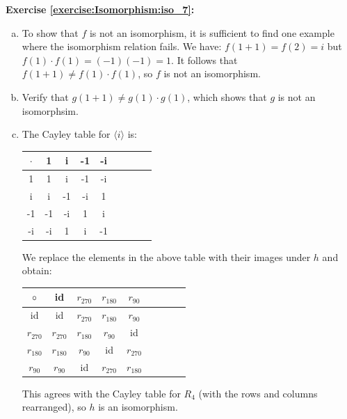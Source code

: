 \noindent\textbf{Exercise \ref{exercise:Isomorphism:iso_7}:}
\begin{enumerate}[(a)]
\item
To show that $f$ is not an isomorphism, it is sufficient to find one example where the isomorphism relation fails.
We have:  $f(1+1) = f(2) = i$  but $f(1) \cdot f(1) = (-1)(-1) = 1$.  It follows that $f(1+1) \neq f(1)\cdot f(1)$, so $f$ is not an isomorphism.

\item
Verify that $g(1+1) \neq g(1)\cdot g(1)$, which shows that $g$ is not an isomorphsim.\\

\item
The Cayley table for $\langle i \rangle$ is:

\begin{multicols}{2}
\begin{table}[H]
{\small
\begin{center}
\begin{tabular}{c|cccccccc}
$\cdot$ & 1 & i & -1 & -i  \\
\hline
1        & 1 & i & -1 & -i  \\
i       & i & -1 & -i & 1  \\
-1       & -1 & -i & 1 & i \\
-i    & -i & 1 & i & -1 \\
\end{tabular}
\end{center}
}
\end{table}
\end{multicols}
We replace the elements in the above table with their images under $h$ and obtain:

\begin{multicols}{2}
\begin{table}[H]
{\small
\begin{center}
\begin{tabular}{c|cccccccc}
$\circ$ & id &$r_{270}$ &$ r_{180}$ & $r_{90}$  \\
\hline
id        & id & $r_{270}$ &$r_{180}$ & $r_{90}$  \\
$r_{270}$ & $r_{270}$ &$r_{180}$ & $r_{90}$ & id \\
$r_{180}$ &$r_{180}$ & $r_{90}$ & id& $r_{270}$  \\
$r_{90}$   & $r_{90}$ & id& $r_{270}$ &$r_{180}$ \\
\end{tabular}
\end{center}
}
\end{table}
\end{multicols}
This agrees with the Cayley table for $R_4$ (with the rows and columns rearranged), so $h$ is an isomorphism.


\end{enumerate}
